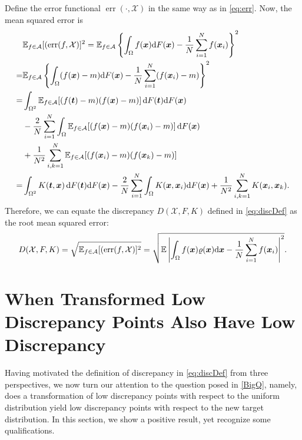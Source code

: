 \documentclass[graybox]{svmult}
\newcommand{\vx}{\boldsymbol{x}}
\newcommand{\vt}{\boldsymbol{t}}
\newcommand{\dif}{{\rm d}}
\newcommand{\Xdes}{\mathcal{X}}
\newcommand{\Ex}{\mathbb{E}}
\DeclareMathOperator{\err}{err}
\def\abs#1{\ensuremath{\left \lvert #1 \right \rvert}}
\begin{document}
Define the error functional $\err(\cdot,\Xdes)$ in the same way as in \eqref{eq:err}.  Now, the mean squared error is 
\begin{align*}
&\Ex_{f\in\mathcal{A}}[(\err(f,\Xdes)]^2= \Ex_{f\in\mathcal{A}} \left\{\int_{\Omega}f(\vx)\dif F(\vx)-\frac{1}{N}\sum_{i=1}^N f(\vx_i) \right\}^2\\
=&\Ex_{f\in\mathcal{A}}\left\{\int_{\Omega}(f(\vx)-m)\dif F(\vx)-\frac{1}{N}\sum_{i=1}^N (f(\vx_i)-m) \right\}^2\\
=&\int_{\Omega^2}\Ex_{f\in \mathcal{A}}[ (f(\vt)-m)(f(\vx)-m)] \, \dif F(\vt)\dif F(\vx)\\
&-\frac{2}{N}\sum_{i=1}^N \int_{\Omega} \Ex_{f\in\mathcal{A}}[(f(\vx)-m)(f(\vx_i)-m)]\,\dif F(\vx)\\
&+\frac{1}{N^2}\sum_{i,k=1}^N\Ex_{f\in\mathcal{A}}[(f(\vx_i)-m)(f(\vx_k)-m)]\\
=&\int_{\Omega^2}K(\vt,\vx) \, \dif F(\vt)\dif F(\vx)-\frac{2}{N}\sum_{i=1}^N \int_{\Omega} K(\vx, \vx_i)\dif F(\vx)+\frac{1}{N^2} \sum_{i,k=1}^N K(\vx_i,\vx_k). 
\end{align*}
Therefore, we can equate the discrepancy $D(\Xdes, F, K)$ defined in \eqref{eq:discDef} as the root mean squared error:
\[
D(\Xdes, F, K) =\sqrt{\Ex_{f\in\mathcal{A}}[(\err(f,\Xdes)]^2}=\sqrt{\Ex\abs{\int_{\Omega}f(\vx)\varrho(\vx)\dif \vx-\frac{1}{N}\sum_{i=1}^N f(\vx_i)}^2}.
\]

\section{When Transformed Low Discrepancy Points Also Have Low Discrepancy}
Having motivated the definition of discrepancy in \eqref{eq:discDef} from three perspectives, we now turn our attention to the question posed in \eqref{BigQ}, namely, does a transformation of low discrepancy points with respect to the uniform distribution yield low discrepancy points with respect to the new target distribution. In this section, we show a positive result, yet recognize some qualifications.
\end{document}
